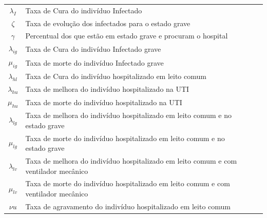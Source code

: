 \documentclass[12pt,letterpaper]{article}
\begin{document}
\begin{table}[h]
\begin{tabular}{|c|p{10cm}|p{4cm}|l|l}
		$\lambda_I$    & Taxa de Cura do indivíduo Infectado                                                   &                           &             &   \\ \cline{1-4}
		$\zeta$        & Taxa de evolução dos infectados para o estado grave                                  &                           &             &   \\ \cline{1-4}
		$\gamma$       & Percentual dos que estão em estado grave e procuram o hospital                        &                           &             &   \\ \cline{1-4}
		$\lambda_{ig}$ & Taxa de Cura do indivíduo Infectado grave                                             &                           &             &   \\ \cline{1-4}
		$\mu_{ig}$     & Taxa de morte do indivíduo Infectado grave                                            &                           &             &   \\ \cline{1-4}
		$\lambda_{hl}$ & Taxa de Cura do indivíduo hospitalizado em leito comum                                &                           &             &   \\ \cline{1-4}
		$\lambda_{hu}$ & Taxa de melhora do indivíduo hospitalizado  na UTI                                    &                           &             &   \\ \cline{1-4}
		$\mu_{hu}$     & Taxa de morte do indivíduo hospitalizado  na UTI                                      &                           &             &   \\ \cline{1-4}
		$\lambda_{lg}$ & Taxa de melhora do indivíduo hospitalizado  em leito comum e no estado grave          &                           &             &   \\ \cline{1-4}
		$\mu_{lg}$     & Taxa de morte do indivíduo hospitalizado  em leito comum e no estado grave            &                           &             &   \\ \cline{1-4}
		$\lambda_{lv}$ & Taxa de melhora do indivíduo hospitalizado  em leito comum e com ventilador mecânico &                           &             &   \\ \cline{1-4}
		$\mu_{lv}$     & Taxa de morte do indivíduo hospitalizado  em leito comum e com ventilador mecânico   &                           &             &   \\ \cline{1-4}
		$\nu{u}$       & Taxa de agravamento do indivíduo hospitalizado em leito comum                         &                           &             &   \\ \cline{1-4}

\end{tabular}
\end{table}
\end{document}
